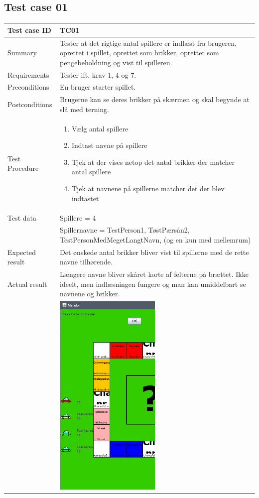 \documentclass{article}
\begin{document}
\subsection{Test case 01}
\begin{tabular}{ | m{} | m{}|}
    \hline
    Test case ID & TC01  \\
    \hline
    Summary & Tester at det rigtige antal spillere er indlæst fra brugeren, oprettet i spillet, oprettet som brikker, oprettet som pengebeholdning og vist til spilleren.\\
    \hline
    Requirements & Tester ift. krav 1, 4 og 7.\\
    \hline
    Preconditions & En bruger starter spillet.\\
    \hline
    Postconditions & Brugerne kan se deres brikker på skærmen og skal begynde at slå med terning.\\
    \hline
    Test Procedure & \begin{enumerate}[itemsep=0.1mm]
        \item Vælg antal spillere
        \item Indtast navne på spillere
        \item Tjek at der vises netop det antal brikker der matcher antal spillere
        \item Tjek at navnene på spillerne matcher det der blev indtastet
    \end{enumerate}\\
    \hline
    Test data &  Spillere = 4\\
     & Spillernavne = TestPerson1, TøstPærsån2, TestPersonMedMegetLangtNavn, (og en kun med mellemrum)\\
    \hline
    Expected result & Det ønskede antal brikker bliver vist til spillerne med de rette navne tilhørende.\\
    \hline
    Actual result & Længere navne bliver skåret korte af felterne på brættet. Ikke ideelt, men indlæsningen fungere og man kan umiddelbart se navnene og brikker.\\
     & \includegraphics[height = 10cm]{Billeder/TC01.jpg}\\

\end{tabular}
\end{document}
